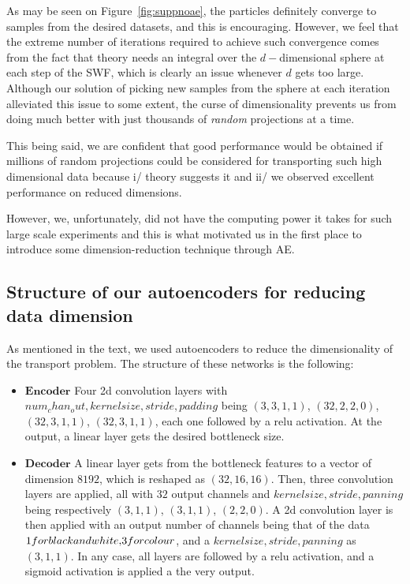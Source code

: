 As may be seen on Figure~\ref{fig:suppnoae}, the particles definitely converge to samples from the desired datasets, and this is encouraging. However, we feel that the extreme number of iterations required to achieve such convergence comes from the fact that theory needs an integral over the $d-$dimensional sphere at each step of the SWF, which is clearly an issue whenever $d$ gets too large.
Although our solution of picking new samples from the sphere at each iteration alleviated this issue to some extent, the curse of dimensionality prevents us from doing much better with just thousands of \emph{random} projections at a time.

This being said, we are confident that good performance would be obtained if millions of random projections could be considered for transporting such high dimensional data because i/ theory suggests it and ii/ we observed excellent performance on reduced dimensions.

However, we, unfortunately, did not have the computing power it takes for such large scale experiments and this is what motivated us in the first place to introduce some dimension-reduction technique through AE.

\subsection{Structure of our autoencoders for reducing data dimension}

As mentioned in the text, we used autoencoders to reduce the dimensionality of the transport problem. The structure of these networks is the following:

\begin{itemize}
  \item $\textbf{Encoder}$ Four 2d convolution layers with \(num_chan_out, kernel size, stride, padding\) being $(3,3,1,1)$, $(32,2,2,0)$, $(32,3,1,1)$, $(32, 3,1,1)$, each one followed by a relu activation. At the output, a linear layer gets the desired bottleneck size.

  \item $\textbf{Decoder}$ A linear layer gets from the bottleneck features to a vector of dimension $8192$, which is reshaped as $(32, 16,16)$. Then, three convolution layers are applied, all with $32$ output channels and \(kernel size, stride, panning\) being respectively $(3,1,1)$, $(3,1,1)$, $(2,2,0)$. A 2d convolution layer is then applied with an output number of channels being that of the data \($1$ for black and white, $3$ for colour\), and a \(kernel size, stride, panning\) as $(3,1,1)$. In any case, all layers are followed by a relu activation, and a sigmoid activation is applied a the very output.
\end{itemize}

